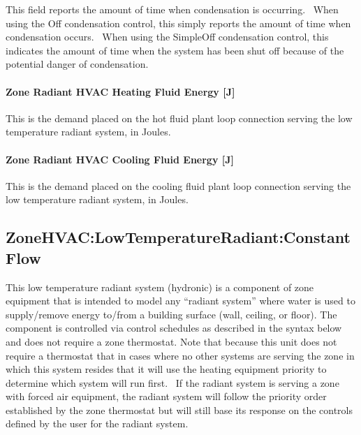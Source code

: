 This field reports the amount of time when condensation is occurring.~ When using the Off condensation control, this simply reports the amount of time when condensation occurs.~ When using the SimpleOff condensation control, this indicates the amount of time when the system has been shut off because of the potential danger of condensation.

\paragraph{Zone Radiant HVAC Heating Fluid Energy {[}J{]}}\label{zone-radiant-hvac-heating-fluid-energy-j}

This is the demand placed on the hot fluid plant loop connection serving the low temperature radiant system, in Joules.

\paragraph{Zone Radiant HVAC Cooling Fluid Energy {[}J{]}}\label{zone-radiant-hvac-cooling-fluid-energy-j}

This is the demand placed on the cooling fluid plant loop connection serving the low temperature radiant system, in Joules.

\subsection{ZoneHVAC:LowTemperatureRadiant:ConstantFlow}\label{zonehvaclowtemperatureradiantconstantflow}

This low temperature radiant system (hydronic) is a component of zone equipment that is intended to model any ``radiant system'' where water is used to supply/remove energy to/from a building surface (wall, ceiling, or floor). The component is controlled via control schedules as described in the syntax below and does not require a zone thermostat. Note that because this unit does not require a thermostat that in cases where no other systems are serving the zone in which this system resides that it will use the heating equipment priority to determine which system will run first.~ If the radiant system is serving a zone with forced air equipment, the radiant system will follow the priority order established by the zone thermostat but will still base its response on the controls defined by the user for the radiant system.

